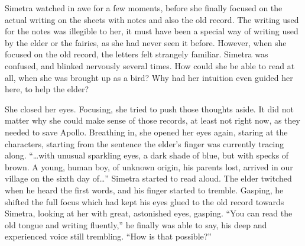 Simetra watched in awe for a few moments, before she finally focused on the actual writing on the sheets with notes and also the old record. The writing used for the notes was illegible to her, it must have been a special way of writing used by the elder or the fairies, as she had never seen it before. However, when she focused on the old record, the letters felt strangely familiar. Simetra was confused, and blinked nervously several times. How could she be able to read at all, when she was brought up as a bird? Why had her intuition even guided her here, to help the elder?

She closed her eyes. Focusing, she tried to push those thoughts aside. It did not matter why she could make sense  of those records, at least not right now, as they needed to save Apollo. Breathing in, she opened her eyes again, staring at the characters, starting from the sentence the elder's finger was currently tracing along. \enquote{\dots with unusual sparkling eyes, a dark shade of blue, but with specks of brown. A young, human boy, of unknown origin, his parents lost, arrived in our village on the sixth day of\dots} Simetra started to read aloud. The elder twitched when he heard the first words, and his finger started to tremble. Gasping, he shifted the full focus which had kept his eyes glued to the old record towards Simetra, looking at her with great, astonished eyes, gasping. \enquote{You can read the old tongue and writing fluently,} he finally was able to say, his deep and experienced voice still trembling. \enquote{How is that possible?}
